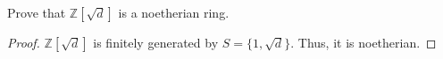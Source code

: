 \begin{problem}
    Prove that $\mathbb{Z}[\sqrt{d}]$ is a noetherian ring.
    \begin{sol}
        \begin{proof}
            $\mathbb{Z}[\sqrt{d}]$ is finitely generated by $S = \{1, \sqrt{d}\}$.
            Thus, it is noetherian.
        \end{proof}
    \end{sol}
\end{problem}